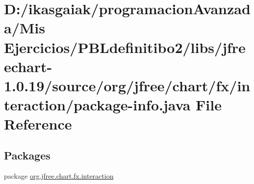 \hypertarget{interaction_2package-info_8java}{}\section{D\+:/ikasgaiak/programacion\+Avanzada/\+Mis Ejercicios/\+P\+B\+Ldefinitibo2/libs/jfreechart-\/1.0.19/source/org/jfree/chart/fx/interaction/package-\/info.java File Reference}
\label{interaction_2package-info_8java}
\subsection*{Packages}
\begin{DoxyCompactItemize}
\item 
package \mbox{\hyperlink{namespaceorg_1_1jfree_1_1chart_1_1fx_1_1interaction}{org.\+jfree.\+chart.\+fx.\+interaction}}
\end{DoxyCompactItemize}
